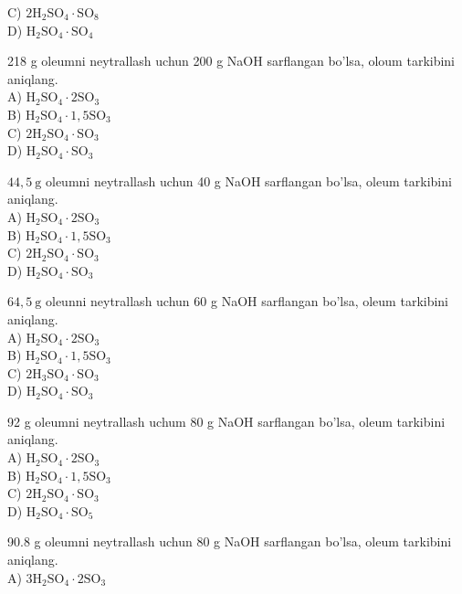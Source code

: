 C) $2 \mathrm{H}_{2} \mathrm{SO}_{4} \cdot \mathrm{SO}_{8}$\\
D) $\mathrm{H}_{2} \mathrm{SO}_{4} \cdot \mathrm{SO}_{4}$
  \item 218 g oleumni neytrallash uchun 200 g NaOH sarflangan bo'lsa, oloum tarkibini aniqlang.\\
A) $\mathrm{H}_{2} \mathrm{SO}_{4} \cdot 2 \mathrm{SO}_{3}$\\
B) $\mathrm{H}_{2} \mathrm{SO}_{4} \cdot 1,5 \mathrm{SO}_{3}$\\
C) $2 \mathrm{H}_{2} \mathrm{SO}_{4} \cdot \mathrm{SO}_{3}$\\
D) $\mathrm{H}_{2} \mathrm{SO}_{4} \cdot \mathrm{SO}_{3}$
  \item $44,5 \mathrm{~g}$ oleumni neytrallash uchun 40 g NaOH sarflangan bo'lsa, oleum tarkibini aniqlang.\\
A) $\mathrm{H}_{2} \mathrm{SO}_{4} \cdot 2 \mathrm{SO}_{3}$\\
B) $\mathrm{H}_{2} \mathrm{SO}_{4} \cdot 1,5 \mathrm{SO}_{3}$\\
C) $2 \mathrm{H}_{2} \mathrm{SO}_{4} \cdot \mathrm{SO}_{3}$\\
D) $\mathrm{H}_{2} \mathrm{SO}_{4} \cdot \mathrm{SO}_{3}$
  \item $64,5 \mathrm{~g}$ oleunni neytrallash uchun 60 g NaOH sarflangan bo'lsa, oleum tarkibini aniqlang.\\
A) $\mathrm{H}_{2} \mathrm{SO}_{4} \cdot 2 \mathrm{SO}_{3}$\\
B) $\mathrm{H}_{2} \mathrm{SO}_{4} \cdot 1,5 \mathrm{SO}_{3}$\\
C) $2 \mathrm{H}_{3} \mathrm{SO}_{4} \cdot \mathrm{SO}_{3}$\\
D) $\mathrm{H}_{2} \mathrm{SO}_{4} \cdot \mathrm{SO}_{3}$
  \item 92 g oleumni neytrallash uchum 80 g NaOH sarflangan bo'lsa, oleum tarkibini aniqlang.\\
A) $\mathrm{H}_{2} \mathrm{SO}_{4} \cdot 2 \mathrm{SO}_{3}$\\
B) $\mathrm{H}_{2} \mathrm{SO}_{4} \cdot 1,5 \mathrm{SO}_{3}$\\
C) $2 \mathrm{H}_{2} \mathrm{SO}_{4} \cdot \mathrm{SO}_{3}$\\
D) $\mathrm{H}_{2} \mathrm{SO}_{4} \cdot \mathrm{SO}_{5}$
  \item 90.8 g oleumni neytrallash uchun 80 g NaOH sarflangan bo'lsa, oleum tarkibini aniqlang.\\
A) $3 \mathrm{H}_{2} \mathrm{SO}_{4} \cdot 2 \mathrm{SO}_{3}$\\
